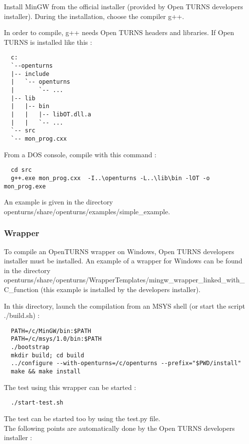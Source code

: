 \documentclass[11pt]{article}
\begin{document}
Install MinGW from the official installer (provided by Open TURNS developers installer). During the installation, choose the compiler g++.

In order to compile, g++ needs Open TURNS headers and libraries.
If Open TURNS is installed like this :
\begin{verbatim}
  c:
  `--openturns
  |-- include
  |   `-- openturns
  |       `-- ...
  |-- lib
  |   |-- bin
  |   |   |-- libOT.dll.a
  |   |   `-- ...
  `-- src
  `-- mon_prog.cxx
\end{verbatim}

From a DOS console, compile with this command :
\begin{verbatim}
  cd src
  g++.exe mon_prog.cxx  -I..\openturns -L..\lib\bin -lOT -o mon_prog.exe
\end{verbatim}

An example is given in the directory openturns/share/openturns/examples/simple\_example.


\subsubsection{Wrapper}

To compile an OpenTURNS wrapper on Windows, Open TURNS developers installer must be installed.
An example of a wrapper for Windows can be found in the directory openturns/share/openturns/WrapperTemplates/mingw\_wrapper\_linked\_with\_C\_function (this example is installed by the developers installer).

In this directory, launch the compilation from an MSYS shell (or start the script ./build.sh) :
\begin{verbatim}
  PATH=/c/MinGW/bin:$PATH
  PATH=/c/msys/1.0/bin:$PATH
  ./bootstrap
  mkdir build; cd build
  ../configure --with-openturns=/c/openturns --prefix="$PWD/install"
  make && make install
\end{verbatim}

The test using this wrapper can be started :
\begin{verbatim}
  ./start-test.sh
\end{verbatim}
The test can be started too by using the test.py file.\\

The following points are automatically done by the Open TURNS developers installer :
\end{document}
